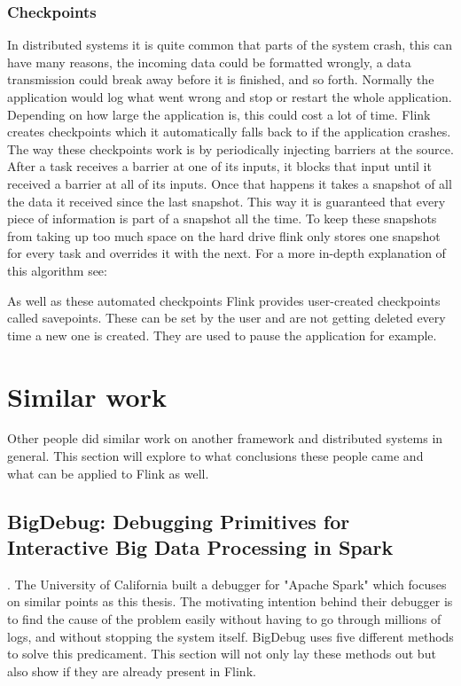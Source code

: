 \subsubsection{Checkpoints}
\label{checkpoints}

In distributed systems it is quite common that parts of the system crash, this can have many reasons, the incoming data could be formatted wrongly, a data transmission could break away before it is finished, and so forth. Normally the application would log what went wrong and stop or restart the whole application. Depending on how large the application is, this could cost a lot of time. Flink creates checkpoints which it automatically falls back to if the application crashes. The way these checkpoints work is by periodically injecting barriers at the source. After a task receives a barrier at one of its inputs, it blocks that input until it received a barrier at all of its inputs. Once that happens it takes a snapshot of all the data it received since the last snapshot. This way it is guaranteed that every piece of information is part of a snapshot all the time. To keep these snapshots from taking up too much space on the hard drive flink only stores one snapshot for every task and overrides it with the next. For a more in-depth explanation of this algorithm see: \cite{DBLP:journals/corr/CarboneFEHT15}

As well as these automated checkpoints Flink provides user-created checkpoints called savepoints. These can be set by the user and are not getting deleted every time a new one is created. They are used to pause the application for example.


\section{Similar work}
\label{similarWork}

Other people did similar work on another framework and distributed systems in general. This section will explore to what conclusions these people came and what can be applied to Flink as well.

\subsection{BigDebug: Debugging Primitives for Interactive Big Data Processing in Spark}

\cite{Gulzar:2016:BDP:2884781.2884813}. The University of California built a debugger for "Apache Spark" which focuses on similar points as this thesis. The motivating intention behind their debugger is to find the cause of the problem easily without having to go through millions of logs, and without stopping the system itself. BigDebug uses five different methods to solve this predicament. This section will not only lay these methods out but also show if they are already present in Flink.

